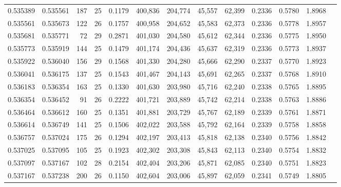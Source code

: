 \begin{tabular}{rrrrrrrrrrrrr}
0.535389 & 0.535561 &   187 &  25 &                                     0.1179 & 400,836 & 204,774 &  45,557 &  62,399 & 0.2336 & 0.5780 & 1.8968 \\
0.535561 & 0.535673 &   122 &  26 &                                     0.1757 & 400,958 & 204,652 &  45,583 &  62,373 & 0.2336 & 0.5778 & 1.8957 \\
0.535681 & 0.535771 &    72 &  29 &                                     0.2871 & 401,030 & 204,580 &  45,612 &  62,344 & 0.2336 & 0.5775 & 1.8950 \\
0.535773 & 0.535919 &   144 &  25 &                                     0.1479 & 401,174 & 204,436 &  45,637 &  62,319 & 0.2336 & 0.5773 & 1.8937 \\
0.535922 & 0.536040 &   156 &  29 &                                     0.1568 & 401,330 & 204,280 &  45,666 &  62,290 & 0.2337 & 0.5770 & 1.8923 \\
0.536041 & 0.536175 &   137 &  25 &                                     0.1543 & 401,467 & 204,143 &  45,691 &  62,265 & 0.2337 & 0.5768 & 1.8910 \\
0.536183 & 0.536354 &   163 &  25 &                                     0.1330 & 401,630 & 203,980 &  45,716 &  62,240 & 0.2338 & 0.5765 & 1.8895 \\
0.536354 & 0.536452 &    91 &  26 &                                     0.2222 & 401,721 & 203,889 &  45,742 &  62,214 & 0.2338 & 0.5763 & 1.8886 \\
0.536464 & 0.536612 &   160 &  25 &                                     0.1351 & 401,881 & 203,729 &  45,767 &  62,189 & 0.2339 & 0.5761 & 1.8871 \\
0.536614 & 0.536749 &   141 &  25 &                                     0.1506 & 402,022 & 203,588 &  45,792 &  62,164 & 0.2339 & 0.5758 & 1.8858 \\
0.536757 & 0.537024 &   175 &  26 &                                     0.1294 & 402,197 & 203,413 &  45,818 &  62,138 & 0.2340 & 0.5756 & 1.8842 \\
0.537025 & 0.537095 &   105 &  25 &                                     0.1923 & 402,302 & 203,308 &  45,843 &  62,113 & 0.2340 & 0.5754 & 1.8832 \\
0.537097 & 0.537167 &   102 &  28 &                                     0.2154 & 402,404 & 203,206 &  45,871 &  62,085 & 0.2340 & 0.5751 & 1.8823 \\
0.537167 & 0.537238 &   200 &  26 &                                     0.1150 & 402,604 & 203,006 &  45,897 &  62,059 & 0.2341 & 0.5749 & 1.8805 \\

\end{tabular}
